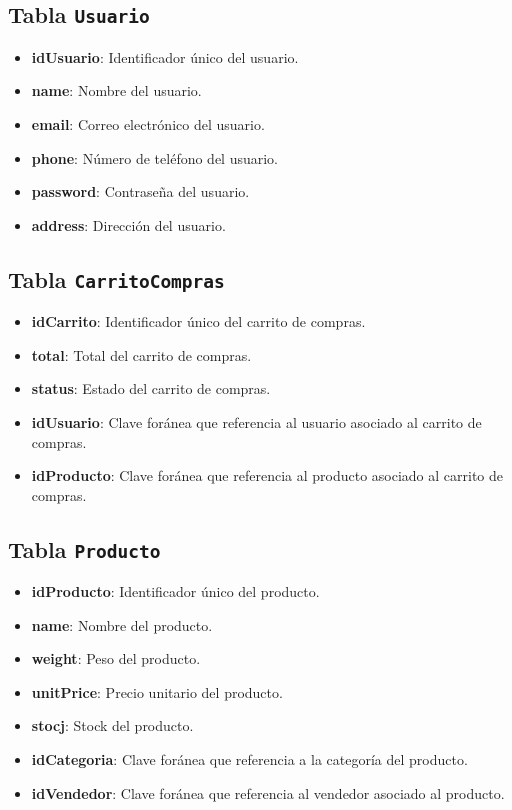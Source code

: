 \documentclass{article}
\begin{document}
\begin{itemize}
\subsection*{Tabla \texttt{Usuario}}
\begin{itemize}[leftmargin=*]
    \item \textbf{idUsuario}: Identificador único del usuario.
    \item \textbf{name}: Nombre del usuario.
    \item \textbf{email}: Correo electrónico del usuario.
    \item \textbf{phone}: Número de teléfono del usuario.
    \item \textbf{password}: Contraseña del usuario.
    \item \textbf{address}: Dirección del usuario.
\end{itemize}

\subsection*{Tabla \texttt{CarritoCompras}}
\begin{itemize}[leftmargin=*]
    \item \textbf{idCarrito}: Identificador único del carrito de compras.
    \item \textbf{total}: Total del carrito de compras.
    \item \textbf{status}: Estado del carrito de compras.
    \item \textbf{idUsuario}: Clave foránea que referencia al usuario asociado al carrito de compras.
    \item \textbf{idProducto}: Clave foránea que referencia al producto asociado al carrito de compras.
\end{itemize}

\subsection*{Tabla \texttt{Producto}}
\begin{itemize}[leftmargin=*]
    \item \textbf{idProducto}: Identificador único del producto.
    \item \textbf{name}: Nombre del producto.
    \item \textbf{weight}: Peso del producto.
    \item \textbf{unitPrice}: Precio unitario del producto.
    \item \textbf{stocj}: Stock del producto.
    \item \textbf{idCategoria}: Clave foránea que referencia a la categoría del producto.
    \item \textbf{idVendedor}: Clave foránea que referencia al vendedor asociado al producto.
\end{itemize}


\end{itemize}
\end{document}
